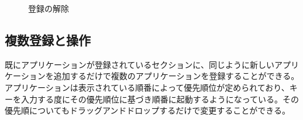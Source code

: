 \begin{figure}[h]
    \begin{center}
    \end{center}
    \caption{登録の解除}
    \label{fig:delete}
\end{figure}

\subsection{複数登録と操作}
既にアプリケーションが登録されているセクションに、同じように新しいアプリケーションを追加するだけで複数のアプリケーションを登録することができる。アプリケーションは表示されている順番によって優先順位が定められており、キーを入力する度にその優先順位に基づき順番に起動するようになっている。その優先順についてもドラッグアンドドロップするだけで変更することができる。